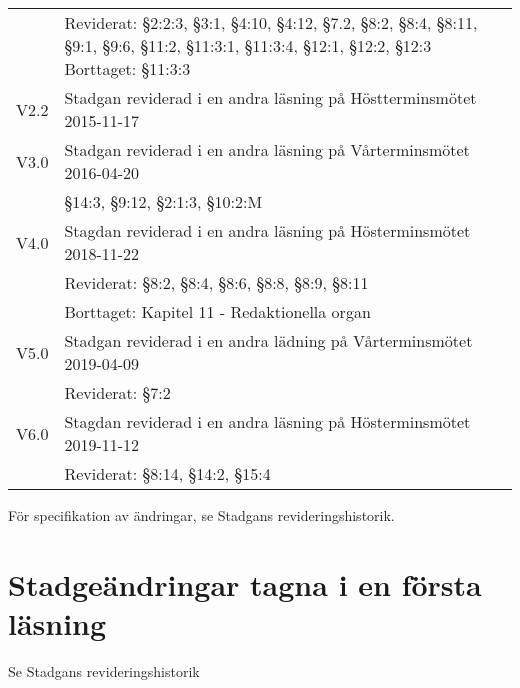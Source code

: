 \documentclass[10pt]{article}
\begin{document}
\begin{tabular}{p{7mm} p{110mm}}
        & Reviderat: §2:2:3, §3:1, §4:10, §4:12, §7.2, §8:2, §8:4, §8:11, §9:1, §9:6, §11:2, §11:3:1,
        §11:3:4, §12:1, §12:2, §12:3
        Borttaget: §11:3:3\\
        V2.2 & Stadgan reviderad i en andra läsning på Höstterminsmötet 2015-11-17\\
        V3.0 & Stadgan reviderad i en andra läsning på Vårterminsmötet 2016-04-20\\
        & \S14:3, \S9:12, \S2:1:3, \S10:2:M\\
        V4.0 & Stagdan reviderad i en andra läsning på Hösterminsmötet 2018-11-22\\
        & Reviderat: \S8:2, \S8:4, \S8:6, \S8:8, \S8:9, \S8:11\\
        & Borttaget: Kapitel 11 - Redaktionella organ\\
       V5.0 & Stadgan reviderad i en andra lädning på Vårterminsmötet 2019-04-09 \\ 
       & Reviderat: \S7:2 \\
       V6.0 & Stagdan reviderad i en andra läsning på Hösterminsmötet 2019-11-12\\
        & Reviderat: \S8:14, \S14:2, \S15:4\\
    \end{tabular}
    \renewcommand*\arraystretch{1.3}
    
    För specifikation av ändringar, se Stadgans revideringshistorik.
    
    \section*{Stadgeändringar tagna i en första läsning}
    
    Se Stadgans revideringshistorik
    
    
\end{document}
